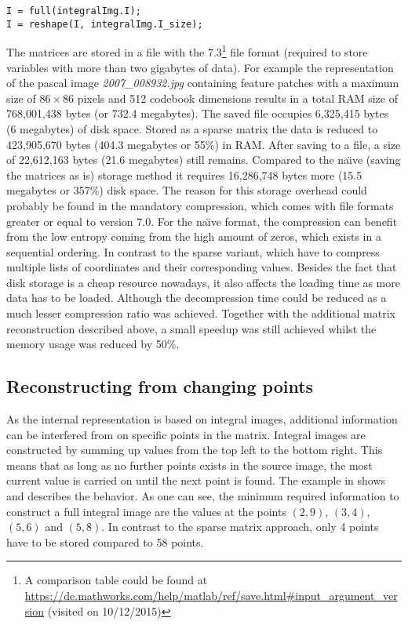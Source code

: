\begin{lstlisting}[firstnumber=29,caption={Sparse reconstruction by \MATLAB (getCodebookIntegrals.m)},label=lst:reconstruct_sparse_matlab]
I = full(integralImg.I);
I = reshape(I, integralImg.I_size);
\end{lstlisting}

The matrices are stored in a \MATLAB file with the 7.3\footnote{A comparison table could be found at \url{https://de.mathworks.com/help/matlab/ref/save.html\#input_argument_version} (visited on 10/12/2015)} file format (required to store variables with more than two gigabytes of data).
For example the representation of the pascal image \textit{2007\_008932.jpg} containing feature patches with a maximum size of $86\times86$ pixels and 512 codebook dimensions results in a total \ac{RAM} size of 768,001,438 bytes (or 732.4 megabytes). The saved \MATLAB file occupies 6,325,415 bytes (6 megabytes) of disk space.
Stored as a sparse matrix the data is reduced to 423,905,670 bytes (404.3 megabytes or 55\%) in \ac{RAM}. After saving to a file, a size of 22,612,163 bytes (21.6 megabytes) still remains. Compared to the na\"{\i}ve (saving the matrices as is) storage method it requires 16,286,748 bytes more (15.5 megabytes or 357\%) disk space. The reason for this storage overhead could probably be found in the mandatory compression, which comes with file formats greater or equal to version 7.0. For the na\"{\i}ve format, the compression can benefit from the low entropy coming from the high amount of zeros, which exists in a sequential ordering. In contrast to the sparse variant, which have to compress multiple lists of coordinates and their corresponding values. Besides the fact that disk storage is a cheap resource nowadays, it also affects the loading time as more data has to be loaded. Although the decompression time could be reduced as a much lesser compression ratio was achieved. Together with the additional matrix reconstruction described above, a small speedup was still achieved whilst the memory usage was reduced by 50\%.

\subsection{Reconstructing from changing points}

As the internal representation is based on integral images, additional information can be interfered from on specific points in the matrix. Integral images are constructed by summing up values from the top left to the bottom right. This means that as long as no further points exists in the source image, the most current value is carried on until the next point is found. The example in  shows and describes the behavior. As one can see, the minimum required information to construct a full integral image are the values at the points $(2,9)$, $(3,4)$, $(5,6)$ and $(5,8)$. In contrast to the sparse matrix approach, only 4 points have to be stored compared to 58 points.


